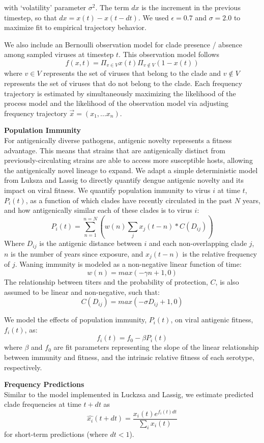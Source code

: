 \documentclass[11pt,oneside,letterpaper]{article}
\begin{document}
with ‘volatility’ parameter $\sigma^2$.
The term $dx$ is the increment in the previous timestep, so that $dx = x(t) - x(t-dt)$.
We used $\epsilon = 0.7$ and $\sigma = 2.0$ to maximize fit to empirical trajectory behavior.

We also include an Bernoulli observation model for clade presence / absence among sampled viruses at timestep $t$.
This observation model follows
$$f(x,t) = \Pi_{v \in V} x(t) \Pi_{v \notin V} (1-x(t))$$
where $v \in V$ represents the set of viruses that belong to the clade and $v \notin V$ represents the set of viruses that do not belong to the clade.
Each frequency trajectory is estimated by simultaneously
maximizing the likelihood of the process model and the likelihood
of the observation model via adjusting frequency trajectory $\vec{x} = (x_1, ... x_n)$.

\textbf{Population Immunity}\\
For antigenically diverse pathogens, antigenic novelty represents a fitness advantage.
This means that strains that are antigenically distinct from previously-circulating strains are able to access more susceptible hosts, allowing the antigenically novel lineage to expand.
We adapt a simple deterministic model from Luksza and Lassig to directly quantify dengue antigenic novelty and its impact on viral fitness.
We quantify population immunity to virus $i$ at time $t$, $P_i(t)$, as a function of which clades have recently circulated in the past $N$ years, and how antigenically similar each of these clades is to virus $i$:
$$P_i(t) = \sum_{n=1}^{n=N} (w(n)  \sum_{j} x_j(t-n) * C( D_{ij}))$$
Where $D_{ij}$ is the antigenic distance between $i$ and each non-overlapping clade $j$, $n$ is the number of years since exposure, and $x_j(t-n)$ is the relative frequency of $j$.
Waning immunity is modeled as a non-negative linear function of time:
$$w(n) = max(-\gamma n + 1, 0)$$
The relationship between titers and the probability of protection, $C$, is also assumed to be linear and non-negative, such that:
$$C(D_{ij}) = max(-\sigma D_{ij} + 1, 0)$$

We model the effects of population immunity, $P_i(t)$, on viral antigenic fitness, $f_i(t)$, as:
$$f_i(t) = f_0-\beta P_i(t)$$
where $\beta$ and $f_0$ are fit parameters representing the slope of the linear relationship between immunity and fitness, and the intrinsic relative fitness of each serotype, respectively.

\textbf{Frequency Predictions}\\
Similar to the model implemented in Luckzsa and Lassig, we estimate predicted clade frequencies at time $t + dt$ as
$$\hat{x_i}(t+dt) = \frac{x_i(t) e^{f_i(t) dt}}{\sum_{i}x_i(t)}$$
for short-term predictions (where $dt < 1$).
\end{document}
